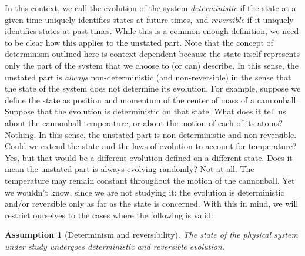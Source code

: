 \documentclass[smallextended]{svjour3}
\numberwithin{equation}{section}
\newtheorem{assump}{Assumption}
\theoremstyle{definition}
\begin{document}
In this context, we call the evolution of the system \emph{deterministic} if the state at a given time uniquely identifies states at future times, and \emph{reversible} if it uniquely identifies states at past times. While this is a common enough definition, we need to be clear how this applies to the unstated part. Note that the concept of determinism outlined here is context dependent because the state itself represents only the part of the system that we choose to (or can) describe. In this sense, the unstated part is \emph{always} non-deterministic (and non-reversible) in the sense that the state of the system does not determine its evolution. For example, suppose we define the state as position and momentum of the center of mass of a cannonball. Suppose that the evolution is deterministic on that state. What does it tell us about the cannonball temperature, or about the motion of each of its atoms? Nothing. In this sense, the unstated part is non-deterministic and non-reversible. Could we extend the state and the laws of evolution to account for temperature? Yes, but that would be a different evolution defined on a different state. Does it mean the unstated part is always evolving randomly? Not at all. The temperature may remain constant throughout the motion of the cannonball. Yet we wouldn't know, since we are not studying it: the evolution is deterministic and/or reversible only as far as the state is concerned. With this in mind, we will restrict ourselves to the cases where the following is valid:

\begin{assump}[Determinism and reversibility]\label{ass:determinism}
The state of the physical system under study undergoes deterministic and reversible evolution.
\end{assump}
\end{document}
